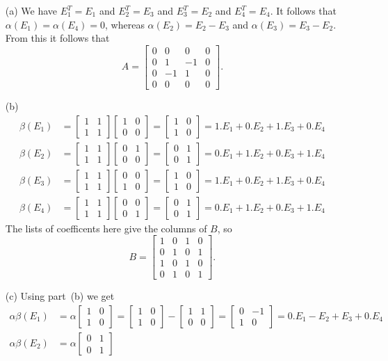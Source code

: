 \documentclass{amsart}
\newcommand{\bsm}       {\left[\begin{smallmatrix}}
\newcommand{\esm}       {\end{smallmatrix}\right]}
\newcommand{\al}        {\alpha}
\newcommand{\bt}        {\beta}
\renewcommand{\:}       {\colon}
\theoremstyle{definition}
\renewenvironment{solution}{\SolutionAtEnd}{\endSolutionAtEnd}
\begin{document}
\begin{solution}
 \begin{itemize}
  \item[(a)] We have $E_1^T=E_1$ and $E_2^T=E_3$ and
   $E_3^T=E_2$ and $E_4^T=E_4$.  It follows that
   $\al(E_1)=\al(E_4)=0$, whereas $\al(E_2)=E_2-E_3$ and
   $\al(E_3)=E_3-E_2$.  From this it follows that
   {\tiny \[
     A = \bsm 0&0&0&0 \\ 0&1&-1&0 \\ 0&-1&1&0\\ 0&0&0&0 \esm.
   \]}
  \item[(b)]
   \begin{align*}
    \bt(E_1) &= \bsm 1&1\\ 1&1\esm \bsm 1&0\\0&0\esm
              = \bsm 1&0\\1&0\esm = 1.E_1+0.E_2+1.E_3 + 0.E_4\\
    \bt(E_2) &= \bsm 1&1\\ 1&1\esm \bsm 0&1\\0&0\esm
              = \bsm 0&1\\0&1\esm = 0.E_1+1.E_2+0.E_3 + 1.E_4\\
    \bt(E_3) &= \bsm 1&1\\ 1&1\esm \bsm 0&0\\1&0\esm
              = \bsm 1&0\\1&0\esm = 1.E_1+0.E_2+1.E_3 + 0.E_4\\
    \bt(E_4) &= \bsm 1&1\\ 1&1\esm \bsm 0&0\\0&1\esm
              = \bsm 0&1\\0&1\esm = 0.E_1+1.E_2+0.E_3 + 1.E_4
   \end{align*}
   The lists of coefficents here give the columns of $B$,
   so
   {\tiny \[
     B = \bsm 1&0&1&0 \\ 0&1&0&1 \\ 1&0&1&0\\ 0&1&0&1 \esm.
   \]}
  \item[(c)] Using part~(b) we get
   \begin{align*}
    \al\bt(E_1) &=\al\bsm 1&0\\1&0\esm 
                 =\bsm 1&0\\1&0\esm -\bsm 1&1\\0&0\esm
                 =\bsm 0&-1\\1&0\esm = 0.E_1-E_2 + E_3 +0.E_4\\
    \al\bt(E_2) &=\al\bsm 0&1\\0&1\esm 

\end{align*}
\end{itemize}
\end{solution}
\end{document}
